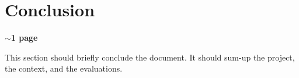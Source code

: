 
\section*{Conclusion }
\textbf{$\sim$1 page }


This section should briefly conclude the document. It should sum-up the project, the context, and the evaluations.
